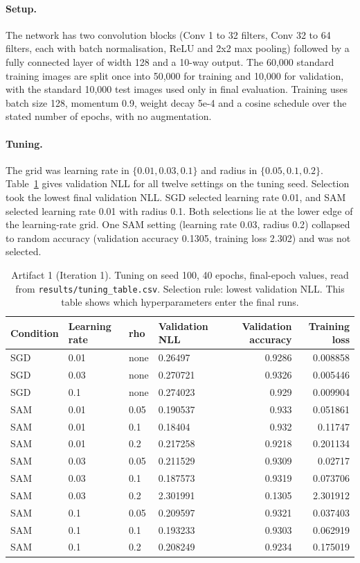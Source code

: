 \documentclass[11pt,letterpaper]{article}
\begin{document}
\paragraph{Setup.} The network has two convolution blocks (Conv 1 to 32 filters, Conv 32 to 64 filters, each with batch normalisation, ReLU and 2x2 max pooling) followed by a fully connected layer of width 128 and a 10-way output. The 60,000 standard training images are split once into 50,000 for training and 10,000 for validation, with the standard 10,000 test images used only in final evaluation. Training uses batch size 128, momentum 0.9, weight decay 5e-4 and a cosine schedule over the stated number of epochs, with no augmentation.

\paragraph{Tuning.} The grid was learning rate in $\{0.01, 0.03, 0.1\}$ and radius in $\{0.05, 0.1, 0.2\}$. Table~\ref{tab:tune1} gives validation NLL for all twelve settings on the tuning seed. Selection took the lowest final validation NLL. SGD selected learning rate 0.01, and SAM selected learning rate 0.01 with radius 0.1. Both selections lie at the lower edge of the learning-rate grid. One SAM setting (learning rate 0.03, radius 0.2) collapsed to random accuracy (validation accuracy 0.1305, training loss 2.302) and was not selected.

\begin{table}[!htbp]
\centering
\footnotesize
\caption{Artifact 1 (Iteration 1). Tuning on seed 100, 40 epochs, final-epoch values, read from \texttt{results/tuning\_table.csv}. Selection rule: lowest validation NLL. This table shows which hyperparameters enter the final runs.}
\label{tab:tune1}
\begin{tabular}{llllrr}
\toprule
Condition & Learning rate & rho & Validation NLL & Validation accuracy & Training loss \\
\midrule
SGD & 0.01 & none & 0.26497 & 0.9286 & 0.008858 \\
SGD & 0.03 & none & 0.270721 & 0.9326 & 0.005446 \\
SGD & 0.1 & none & 0.274023 & 0.929 & 0.009904 \\
SAM & 0.01 & 0.05 & 0.190537 & 0.933 & 0.051861 \\
SAM & 0.01 & 0.1 & 0.18404 & 0.932 & 0.11747 \\
SAM & 0.01 & 0.2 & 0.217258 & 0.9218 & 0.201134 \\
SAM & 0.03 & 0.05 & 0.211529 & 0.9309 & 0.02717 \\
SAM & 0.03 & 0.1 & 0.187573 & 0.9319 & 0.073706 \\
SAM & 0.03 & 0.2 & 2.301991 & 0.1305 & 2.301912 \\
SAM & 0.1 & 0.05 & 0.209597 & 0.9321 & 0.037403 \\
SAM & 0.1 & 0.1 & 0.193233 & 0.9303 & 0.062919 \\
SAM & 0.1 & 0.2 & 0.208249 & 0.9234 & 0.175019 \\
\bottomrule
\end{tabular}
\end{table}
\end{document}
